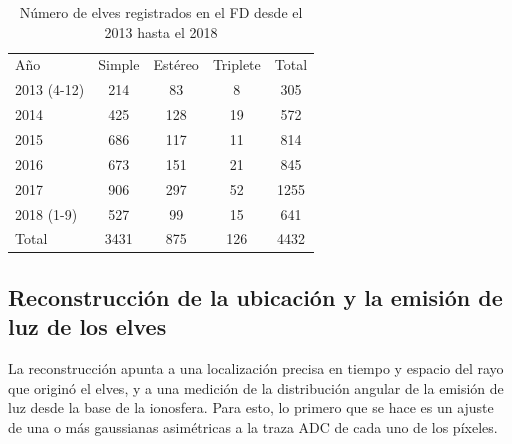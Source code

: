\documentclass[12pt,oneside,openany,letter]{book}
\begin{document}
\begin{table}[]\centering
\caption{N\'umero de elves registrados en el FD desde el 2013 hasta el 2018 \cite{Mussa2019}}
\label{eventos_elves}
\begin{tabular}{lcccc}
\rowcolor[HTML]{EFEFEF} 
Año         & Simple & Estéreo & Triplete & Total                        \\
2013 (4-12) & 214    & 83      & 8        & \cellcolor[HTML]{EFEFEF}305  \\
2014        & 425    & 128     & 19       & \cellcolor[HTML]{EFEFEF}572  \\
2015        & 686    & 117     & 11       & \cellcolor[HTML]{EFEFEF}814  \\
2016        & 673    & 151     & 21       & \cellcolor[HTML]{EFEFEF}845  \\
2017        & 906    & 297     & 52       & \cellcolor[HTML]{EFEFEF}1255 \\
2018 (1-9)  & 527    & 99      & 15       & \cellcolor[HTML]{EFEFEF}641  \\
\rowcolor[HTML]{EFEFEF} 
Total       & 3431   & 875     & 126      & 4432                        
\end{tabular}
\end{table}

\subsection{Reconstrucci\'on de la ubicaci\'on y la emisi\'on de luz de los elves}
La reconstrucción apunta a una localización precisa en tiempo y espacio del rayo que origin\'o el elves, y a una medición de la distribución angular de la emisión de luz desde la base de la ionosfera. Para esto, lo primero que se hace es un ajuste de una o m\'as gaussianas asim\'etricas a la traza ADC de cada uno de los píxeles.
\end{document}
